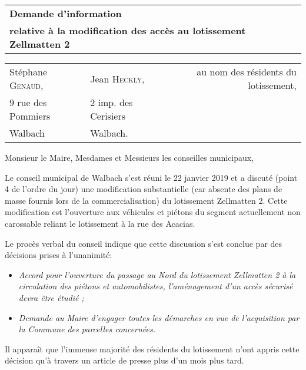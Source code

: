 \documentclass[a4paper,12pt]{article}
\begin{document}
\begin{flushleft}
\begin{tabular}[t]{l}
\Large{\textbf{Demande d'information}}\\[4mm]
\large{\textbf{relative à la modification des accès au lotissement Zellmatten 2}}\\

\end{tabular}%

	  \thispagestyle{empty}
\noindent%
\begin{tabular}[t]{llr}
	  Stéphane \textsc{Genaud}, & Jean \textsc{Heckly}, &  au nom des résidents du lotissement,\\
	  \small{9 rue des Pommiers} & \small{2 imp. des Cerisiers}\\
	  Walbach            & Walbach.\\
\end{tabular}%
\end{flushleft}

\vspace{6mm}

Monsieur le Maire,
Mesdames et Messieurs les conseilles municipaux,


Le conseil municipal de Walbach s'est réuni le 22 janvier 2019 et a discuté (point 4 de l'ordre du jour)
une modification substantielle (car absente des plans de masse fournis lors de la commercialisation) 
du lotissement Zellmatten 2. Cette modification est l'ouverture aux 
véhicules et piétons du segment actuellement non carossable reliant le lotissement à la 
rue des Acacias.

Le procès verbal du conseil indique que cette discussion s'est conclue par des décisions prises à l'unanimité:
\begin{itemize}
	  \item \emph{Accord pour l’ouverture du passage au Nord du lotissement
Zellmatten 2 à la circulation des piétons et automobilistes, l’aménagement d’un
accès sécurisé devra être étudié ;}
\item \emph{Demande au Maire d’engager toutes les démarches en vue de l’acquisition par
	  la Commune des parcelles concernées.}
\end{itemize}


Il apparaît que l'immense majorité des résidents du lotissement n'ont appris cette décision qu'à travers
un article de presse plus d'un mois plus tard.
\end{document}
